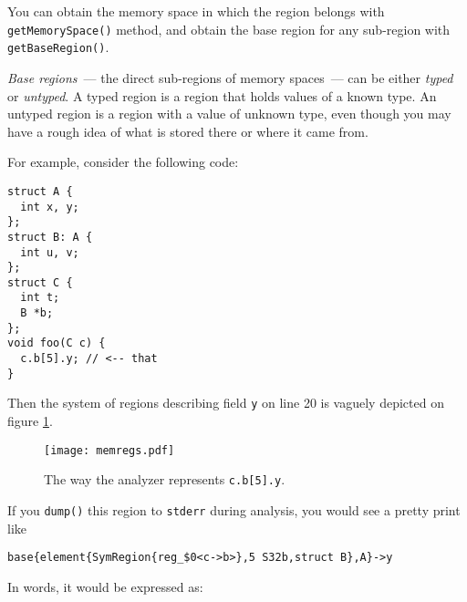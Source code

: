 \documentclass[a4paper,12pt]{article}
\def\imgscale{0.20}
\newenvironment{nobr}{\begin{minipage}{\textwidth}\setlength\parskip{1em}
}{\end{minipage}\ignorespacesafterend}
\begin{document}
You can obtain the memory space in which the region belongs with \lstinline|getMemorySpace()| method, and obtain the base region for any sub-region with \lstinline|getBaseRegion()|.

\emph{Base regions}~--- the direct sub-regions of memory spaces~--- can be either \emph{typed} or \emph{untyped}. A typed region is a region that holds values of a known type. An untyped region is a region with a value of unknown type, even though you may have a rough idea of what is stored there or where it came from.

\begin{nobr}
For example, consider the following code:
\begin{lstlisting}[style=cplusplus]
struct A {
  int x, y;
};
struct B: A {
  int u, v;
};
struct C {
  int t;
  B *b;
};
void foo(C c) {
  c.b[5].y; // <-- that
}
\end{lstlisting}
\end{nobr}

Then the system of regions describing field \lstinline|y| on line 20 is vaguely depicted on figure \ref{fig:memregs}.

\begin{figure}[!ht]\center
\texttt{[image: memregs.pdf]}
\caption{The way the analyzer represents \lstinline|c.b[5].y|.}
\label{fig:memregs}
\end{figure}

\begin{nobr}
If you \lstinline|dump()| this region to \lstinline|stderr| during analysis, you would see a pretty print like
\begin{lstlisting}[style=commandline]
base{element{SymRegion{reg_$0<c->b>},5 S32b,struct B},A}->y
\end{lstlisting}
\end{nobr}

In words, it would be expressed as:
\end{document}
